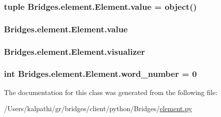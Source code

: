 \subsubsection[{value}]{\setlength{\rightskip}{0pt plus 5cm}tuple Bridges.\+element.\+Element.\+value = object()\hspace{0.3cm}{\ttfamily [static]}}\label{class_bridges_1_1element_1_1_element_af18dea5cfca666c8e4ae29f1a464e7ea}
\hypertarget{class_bridges_1_1element_1_1_element_a54928aa5d8a914e9394ba2fb0e7ef270}{}
\subsubsection[{value}]{\setlength{\rightskip}{0pt plus 5cm}Bridges.\+element.\+Element.\+value}\label{class_bridges_1_1element_1_1_element_a54928aa5d8a914e9394ba2fb0e7ef270}
\hypertarget{class_bridges_1_1element_1_1_element_a929f63e3aaaeff971a1def438168559a}{}
\subsubsection[{visualizer}]{\setlength{\rightskip}{0pt plus 5cm}Bridges.\+element.\+Element.\+visualizer}\label{class_bridges_1_1element_1_1_element_a929f63e3aaaeff971a1def438168559a}
\hypertarget{class_bridges_1_1element_1_1_element_a63a7f47da997db2df55a22715e519dff}{}
\subsubsection[{word\+\_\+number}]{\setlength{\rightskip}{0pt plus 5cm}int Bridges.\+element.\+Element.\+word\+\_\+number = 0\hspace{0.3cm}{\ttfamily [static]}}\label{class_bridges_1_1element_1_1_element_a63a7f47da997db2df55a22715e519dff}


The documentation for this class was generated from the following file\+:\begin{DoxyCompactItemize}
\item 
/\+Users/kalpathi/gr/bridges/client/python/\+Bridges/\hyperlink{element_8py}{element.\+py}\end{DoxyCompactItemize}
